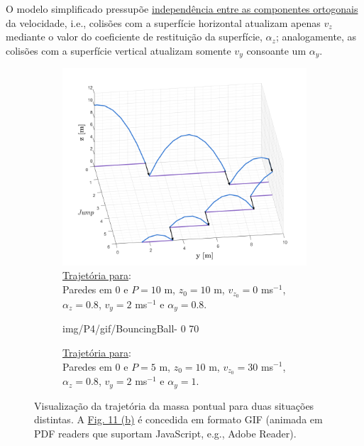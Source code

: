 \vspace{-1em}
\noindent O modelo simplificado pressupõe \underline{independência entre as componentes ortogonais} da velocidade, i.e., colisões com a superfície horizontal atualizam apenas $v_z$ mediante o valor do coeficiente de restituição da superfície, $\alpha_z$; analogamente, as colisões com a superfície vertical atualizam somente $v_y$ consoante um $\alpha_y$.

\begin{figure}[H]
    \begin{subfigure}[b]{0.5\linewidth}
        \centering
        \includegraphics[width=1\linewidth]{img/P4/P4-3dPlot.png}
        \caption{\underline{Trajetória para}:\\ Paredes em $0$ e $P = 10$ m, $z_0 = 10$ m, $v_{z_0} = 0$ ms$^{-1}$, $\alpha_z = 0.8$, $v_y = 2$ ms$^{-1}$ e $\alpha_y = 0.8$.} 
        \label{fig:P4-3dPlot} 
    \end{subfigure}%
    \begin{subfigure}[b]{0.5\linewidth}
        \centering
        {img/P4/gif/BouncingBall-}%
        {0}%
        {70}%
        \caption{\underline{Trajetória para}:\\ Paredes em $0$ e $P = 5$ m, $z_0 = 10$ m, $v_{z_0} = 30$ ms$^{-1}$, $\alpha_z = 0.8$, $v_y = 2$ ms$^{-1}$ e $\alpha_y = 1$.}
        \label{fig:BouncingBallGif}
    \end{subfigure}%
    \caption{Visualização da trajetória da massa pontual para duas situações distintas. A \hyperref[fig:BouncingBallGif]{Fig. 11 (b)} é concedida em formato GIF (animada em PDF readers que suportam JavaScript, e.g., Adobe Reader).}
    \label{fig:P4plots}
\end{figure}

